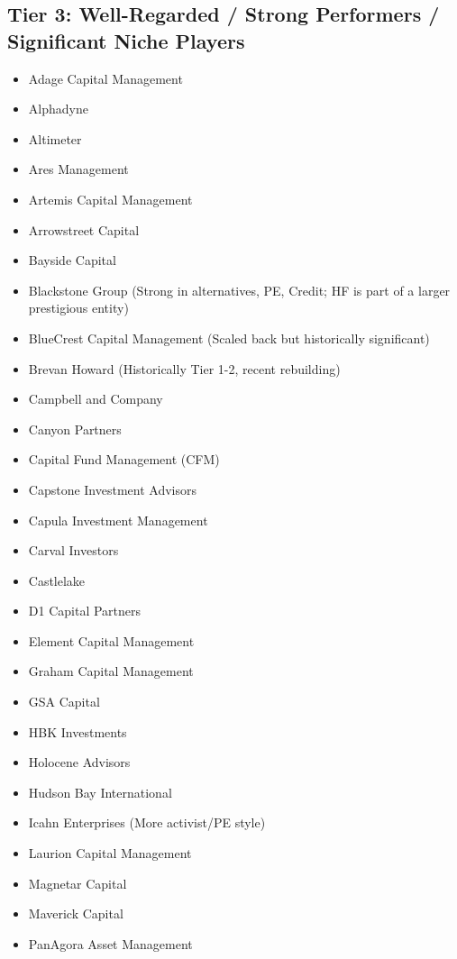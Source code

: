 \documentclass[11pt,a4paper]{article}
\begin{document}
\subsection*{Tier 3: Well-Regarded / Strong Performers / Significant Niche Players}
\begin{multicols}{3}
\begin{itemize}[label=\textbullet, leftmargin=*, itemsep=1pt, parsep=0pt]
    \item Adage Capital Management
    \item Alphadyne
    \item Altimeter
    \item Ares Management
    \item Artemis Capital Management
    \item Arrowstreet Capital
    \item Bayside Capital
    \item Blackstone Group (Strong in alternatives, PE, Credit; HF is part of a larger prestigious entity)
    \item BlueCrest Capital Management (Scaled back but historically significant)
    \item Brevan Howard (Historically Tier 1-2, recent rebuilding)
    \item Campbell and Company
    \item Canyon Partners
    \item Capital Fund Management (CFM)
    \item Capstone Investment Advisors
    \item Capula Investment Management
    \item Carval Investors
    \item Castlelake
    \item D1 Capital Partners
    \item Element Capital Management
    \item Graham Capital Management
    \item GSA Capital
    \item HBK Investments
    \item Holocene Advisors
    \item Hudson Bay International
    \item Icahn Enterprises (More activist/PE style)
    \item Laurion Capital Management
    \item Magnetar Capital
    \item Maverick Capital
    \item PanAgora Asset Management

\end{itemize}
\end{multicols}
\end{document}
